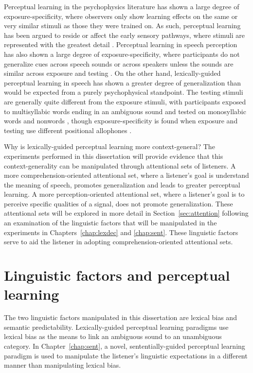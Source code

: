Perceptual learning in the psychophysics literature has shown a large degree of exposure-specificity, where observers only show learning effects on the same or very similar stimuli as those they were trained on. As such, perceptual learning has been argued to reside or affect the early sensory pathways, where stimuli are represented with the greatest detail \citep{Gilbert2001}.  Perceptual learning in speech perception has also shown a large degree of exposure-specificity, where participants do not generalize cues across speech sounds \citep{Reinisch2014} or across speakers unless the sounds are similar across exposure and testing \citep{Eisner2005, Kraljic2005, Kraljic2007, Reinisch2013a}.  
On the other hand, lexically-guided perceptual learning in speech has shown a greater degree of generalization than would be expected from a purely psychophysical standpoint.  
The testing stimuli are generally quite different from the exposure stimuli, with participants exposed to multisyllabic words ending in an ambiguous sound and tested on monosyllabic words \citep{Reinisch2013} and nonwords \citep{Norris2003, Kraljic2005}, though exposure-specificity is found when exposure and testing use different positional allophones \citep{Mitterer2013}.

Why is lexically-guided perceptual learning more context-general?
The experiments performed in this dissertation will provide evidence that this context-generality can be manipulated through attentional sets of listeners.
A more comprehension-oriented attentional set, where a listener's goal is understand the meaning of speech, promotes generalization and leads to greater perceptual learning.  
A more perception-oriented attentional set, where a listener's goal is to perceive specific qualities of a signal, does not promote generalization.
These attentional sets will be explored in more detail in Section~\ref{sec:attention} following an examination of the linguistic factors that will be manipulated in the experiments in Chapters~\ref{chap:lexdec} and \ref{chap:sent}.
These linguistic factors serve to aid the listener in adopting comprehension-oriented attentional sets.

\section{Linguistic factors and perceptual learning}
\label{sec:linguistic}

The two linguistic factors manipulated in this dissertation are lexical bias and semantic predictability.  
Lexically-guided perceptual learning paradigms use lexical bias as the means to link an ambiguous sound to an unambiguous category.
In Chapter~\ref{chap:sent}, a novel, sententially-guided perceptual learning paradigm is used to manipulate the listener's linguistic expectations in a different manner than manipulating lexical bias.


